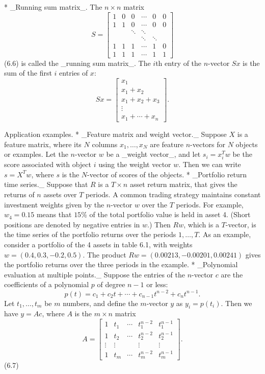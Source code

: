 * _Running sum matrix_. The \(n\times n\) matrix \[S=\left[\begin{array}{cccccc}1&0&0&\cdots&0&0\\ 1&1&0&\cdots&0&0\\ &&\ddots&\ddots&&\\ &&&\ddots&\ddots&\\ 1&1&1&\cdots&1&0\\ 1&1&1&\cdots&1&1\end{array}\right]\] (6.6) is called the _running sum matrix_. The \(i\)th entry of the \(n\)-vector \(Sx\) is the sum of the first \(i\) entries of \(x\): \[Sx=\left[\begin{array}{c}x_{1}\\ x_{1}+x_{2}\\ x_{1}+x_{2}+x_{3}\\ \vdots\\ x_{1}+\cdots+x_{n}\end{array}\right].\]

Application examples.
* _Feature matrix and weight vector._ Suppose \(X\) is a feature matrix, where its \(N\) columns \(x_{1},\ldots,x_{N}\) are feature \(n\)-vectors for \(N\) objects or examples. Let the \(n\)-vector \(w\) be a _weight vector_, and let \(s_{i}=x_{i}^{T}w\) be the score associated with object \(i\) using the weight vector \(w\). Then we can write \(s=X^{T}w\), where \(s\) is the \(N\)-vector of scores of the objects.
* _Portfolio return time series._ Suppose that \(R\) is a \(T\times n\) asset return matrix, that gives the returns of \(n\) assets over \(T\) periods. A common trading strategy maintains constant investment weights given by the \(n\)-vector \(w\) over the \(T\) periods. For example, \(w_{4}=0.15\) means that \(15\%\) of the total portfolio value is held in asset 4. (Short positions are denoted by negative entries in \(w\).) Then \(Rw\), which is a \(T\)-vector, is the time series of the portfolio returns over the periods \(1,\ldots,T\). As an example, consider a portfolio of the 4 assets in table 6.1, with weights \(w=(0.4,0.3,-0.2,0.5)\). The product \(Rw=(0.00213,-0.00201,0.00241)\) gives the portfolio returns over the three periods in the example.
* _Polynomial evaluation at multiple points._ Suppose the entries of the \(n\)-vector \(c\) are the coefficients of a polynomial \(p\) of degree \(n-1\) or less: \[p(t)=c_{1}+c_{2}t+\cdots+c_{n-1}t^{n-2}+c_{n}t^{n-1}.\] Let \(t_{1},\ldots,t_{m}\) be \(m\) numbers, and define the \(m\)-vector \(y\) as \(y_{i}=p(t_{i})\). Then we have \(y=Ac\), where \(A\) is the \(m\times n\) matrix \[A=\left[\begin{array}{ccccc}1&t_{1}&\cdots&t_{1}^{n-2}&t_{1}^{n-1}\\ 1&t_{2}&\cdots&t_{2}^{n-2}&t_{2}^{n-1}\\ \vdots&\vdots&&\vdots&\vdots\\ 1&t_{m}&\cdots&t_{m}^{n-2}&t_{m}^{n-1}\end{array}\right].\] (6.7) 